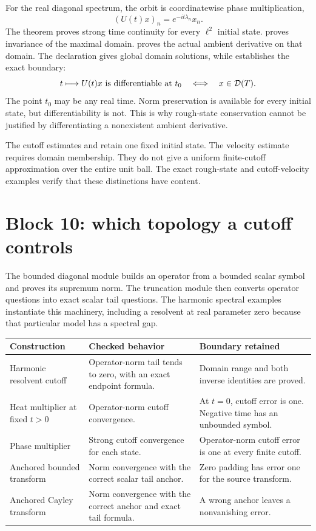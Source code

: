 For the real diagonal spectrum, the orbit is coordinatewise phase multiplication,
\[
 (U(t)x)_n=e^{-it\lambda_n}x_n.
\]
The theorem  proves strong time continuity for every \(\ell^2\) initial state.  proves invariance of the maximal domain.  proves the actual ambient derivative on that domain. The declaration  gives global domain solutions, while  establishes the exact boundary:
\[
 t\longmapsto U(t)x\text{ is differentiable at }t_0
 \quad\Longleftrightarrow\quad x\in\mathcal D(T).
\]
The point \(t_0\) may be any real time. Norm preservation is available for every initial state, but differentiability is not. This is why rough-state conservation cannot be justified by differentiating a nonexistent ambient derivative.

The cutoff estimates  and  retain one fixed initial state. The velocity estimate requires domain membership. They do not give a uniform finite-cutoff approximation over the entire unit ball. The exact rough-state and cutoff-velocity examples verify that these distinctions have content.

\section{Block 10: which topology a cutoff controls}

The bounded diagonal module builds an operator from a bounded scalar symbol and proves its supremum norm. The truncation module then converts operator questions into exact scalar tail questions. The harmonic spectral examples instantiate this machinery, including a resolvent at real parameter zero because that particular model has a spectral gap.

\begin{longtable}{@{}L{.29\textwidth}L{.32\textwidth}L{.30\textwidth}@{}}
\toprule
Construction & Checked behavior & Boundary retained\\
\midrule
\endhead
Harmonic resolvent cutoff & Operator-norm tail tends to zero, with an exact endpoint formula. & Domain range and both inverse identities are proved.\\[3pt]
Heat multiplier at fixed \(t>0\) & Operator-norm cutoff convergence. & At \(t=0\), cutoff error is one. Negative time has an unbounded symbol.\\[3pt]
Phase multiplier & Strong cutoff convergence for each state. & Operator-norm cutoff error is one at every finite cutoff.\\[3pt]
Anchored bounded transform & Norm convergence with the correct scalar tail anchor. & Zero padding has error one for the source transform.\\[3pt]
Anchored Cayley transform & Norm convergence with the correct anchor and exact tail formula. & A wrong anchor leaves a nonvanishing error.\\
\bottomrule
\end{longtable}

